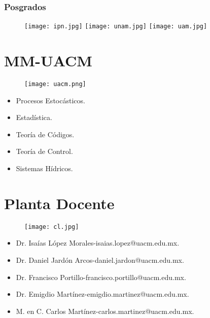 \documentclass[xcolor=dvipsnames]{beamer}
\begin{document}
\begin{frame}\frametitle{Posgrados}

\begin{figure}[H]
\centering
\texttt{[image: ipn.jpg]}\pause
\texttt{[image: unam.jpg]}\pause
\texttt{[image: uam.jpg]}
\end{figure}
\end{frame}



\section{MM-UACM}
\begin{frame}
\begin{figure}[H]
\centering
\texttt{[image: uacm.png]}
\end{figure}
\pause
\begin{itemize}
\item Procesos Estoc\'asticos.\pause
\item Estad\'istica.\pause
\item Teor\'ia de C\'odigos.\pause
\item Teor\'ia de Control.\pause
\item Sistemas H\'idricos.\pause
\end{itemize}
\end{frame}

\section{Planta Docente}


\begin{frame}
\begin{figure}[H]
\centering
\texttt{[image: cl.jpg]}
\end{figure}
\pause
\begin{itemize}
\item Dr. Isa\'ias L\'opez Morales-isaias.lopez@uacm.edu.mx.\pause
\item Dr. Daniel Jard\'on Arcos-daniel.jardon@uacm.edu.mx.\pause
\item Dr. Francisco Portillo-francisco.portillo@uacm.edu.mx.\pause
\item Dr. Emigdio Mart\'inez-emigdio.martinez@uacm.edu.mx.\pause
\item M. en C. Carlos Mart\'inez-carlos.martinez@uacm.edu.mx.\pause
\end{itemize}
\end{frame}
\end{document}

